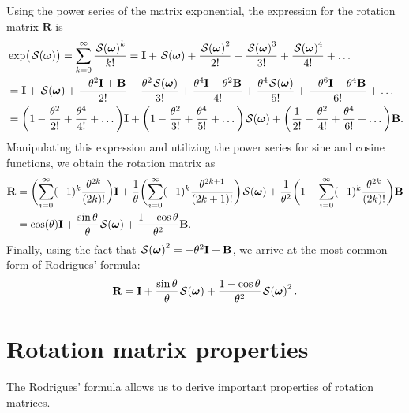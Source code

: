 Using the power series of the matrix exponential, the expression for the rotation matrix $\mathbf{R}$ is
\begin{align}
    \begin{split}
    &\exp\bigl(\SL[\boldsymbol{\omega}]\bigr) = \sum_{k=0}^\infty\frac{\SL[\boldsymbol{\omega}]^k}{k!}
    = \mathbf{I} + \SL[\boldsymbol{\omega}] + \frac{\SL[\boldsymbol{\omega}]^2}{2!} + \frac{\SL[\boldsymbol{\omega}]^3}{3!} + \frac{\SL[\boldsymbol{\omega}]^4}{4!} + \dots\\
    &= \mathbf{I} + \SL[\boldsymbol{\omega}] + \frac{-\theta^2\mathbf{I} + \mathbf{B}}{2!} - \frac{\theta^2\SL[\boldsymbol{\omega}]}{3!} + \frac{\theta^4\mathbf{I} - \theta^2\mathbf{B}}{4!} + \frac{\theta^4\SL[\boldsymbol{\omega}]}{5!} + \frac{-\theta^6\mathbf{I}+\theta^4\mathbf{B}}{6!} +\dots\\
    &= \biggl(1 - \frac{\theta^2}{2!} + \frac{\theta^4}{4!} + \dots\biggr)\mathbf{I} + \biggl(1 - \frac{\theta^2}{3!} + \frac{\theta^4}{5!} + \dots\biggr)\SL[\boldsymbol{\omega}] + \biggl(\frac{1}{2!} - \frac{\theta^2}{4!} + \frac{\theta^4}{6!}+\dots\biggr)\mathbf{B}.
    \end{split}
\end{align}
Manipulating this expression and utilizing the power series for sine and cosine functions, we obtain the rotation matrix as
\begin{align}
    \mathbf{R} &= \biggl(\sum_{i=0}^\infty (-1)^k\frac{\theta^{2k}}{(2k)!}\biggr)\mathbf{I} + \frac{1}{\theta}\biggl(\sum_{i=0}^\infty (-1)^k\frac{\theta^{2k+1}}{(2k+1)!}\biggr)\SL[\boldsymbol{\omega}] + \frac{1}{\theta^2}\biggl(1 - \sum_{i=0}^\infty (-1)^k\frac{\theta^{2k}}{(2k)!}\biggr)\mathbf{B}\\
    &= \cos(\theta)\mathbf{I} + \frac{\sin\theta}{\theta}\SL[\boldsymbol{\omega}] + \frac{1-\cos\theta}{\theta^2}\mathbf{B}. \label{eq:appendix-rodrigues-fomula-with-B}
\end{align}
Finally, using the fact that $\SL[\boldsymbol{\omega}]^2 = -\theta^2\mathbf{I} + \mathbf{B}$, we arrive at the most common form of Rodrigues' formula:
\begin{align}
    \mathbf{R} = \mathbf{I} + \frac{\sin\theta}{\theta}\SL[\boldsymbol{\omega}] + \frac{1-\cos\theta}{\theta^2}\SL[\boldsymbol{\omega}]^2.
\end{align}
\section{Rotation matrix properties}\label{subsec:rotation-matrix-properties}
The Rodrigues' formula allows us to derive important properties of rotation matrices.
